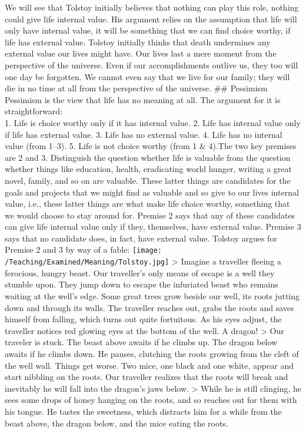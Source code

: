 \documentclass[]{article}
\begin{document}
We will see that Tolstoy initially believes that nothing can play this
role, nothing could give life internal value. His argument relies on the
assumption that life will only have internal value, it will be something
that we can find choice worthy, if life has external value. Tolstoy
initially thinks that death undermines any external value our lives
might have. Our lives last a mere moment from the perspective of the
universe. Even if our accomplishments outlive us, they too will one day
be forgotten. We cannot even say that we live for our family; they will
die in no time at all from the perspective of the universe. \#\#
Pessimism Pessimism is the view that life has no meaning at all. The
argument for it is straightforward:\\1. Life is choice worthy only if it
has internal value. 2. Life has internal value only if life has external
value. 3. Life has no external value. 4. Life has no internal value
(from 1--3). 5. Life is not choice worthy (from 1 \& 4).The two key
premises are 2 and 3. Distinguish the question whether life is valuable
from the question whether things like education, health, eradicating
world hunger, writing a great novel, family, and so on are valuable.
These latter things are candidates for the goals and projects that we
might find as valuable and so give to our lives internal value, i.e.,
these latter things are what make life choice worthy, something that we
would choose to stay around for. Premise 2 says that any of these
candidates can give life internal value only if they, themselves, have
external value. Premise 3 says that no candidate does, in fact, have
external value. Tolstoy argues for Premise 2 and 3 by way of a fable:
\texttt{[image: /Teaching/Examined/Meaning/Tolstoy.jpg]} \textgreater{}
Imagine a traveller fleeing a ferocious, hungry beast. Our traveller's
only means of escape is a well they stumble upon. They jump down to
escape the infuriated beast who remains waiting at the well's edge. Some
great trees grow beside our well, its roots jutting down and through its
walls. The traveller reaches out, grabs the roots and saves himself from
falling, which turns out quite fortuitous. As his eyes adjust, the
traveller notices red glowing eyes at the bottom of the well. A dragon!
\textgreater{} Our traveler is stuck. The beast above awaits if he
climbs up. The dragon below awaits if he climbs down. He pauses,
clutching the roots growing from the cleft of the well wall. Things get
worse. Two mice, one black and one white, appear and start nibbling on
the roots. Our traveller realizes that the roots will break and
inevitably he will fall into the dragon's jaws below. \textgreater{}
While he is still clinging, he sees some drops of honey hanging on the
roots, and so reaches out for them with his tongue. He tastes the
sweetness, which distracts him for a while from the beast above, the
dragon below, and the mice eating the roots.
\end{document}
